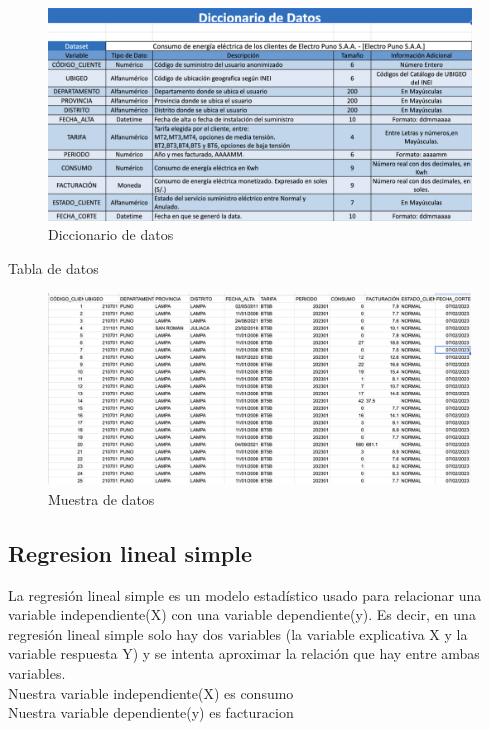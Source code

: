 \documentclass{article}
\begin{document}
\begin{figure}[H]
  \centering
  \includegraphics[width=1\textwidth]{./img/datos.png}
  \caption{Diccionario de datos}
  \label{Diccionario de datos}
\end{figure}

Tabla de datos
\begin{figure}[H]
  \centering
  \includegraphics[width=1\textwidth]{./img/Rdatos.png}
  \caption{Muestra de datos}
  \label{Muestra de datos}
\end{figure}

\subsection{Regresion lineal simple}
La regresión lineal simple es un modelo estadístico usado para relacionar una variable independiente(X) con una variable dependiente(y). Es decir, en una regresión lineal simple solo hay dos variables (la variable explicativa X y la variable respuesta Y) y se intenta aproximar la relación que hay entre ambas variables.
\\

Nuestra variable independiente(X) es consumo
\\

Nuestra variable dependiente(y) es facturacion
\\
\end{document}

